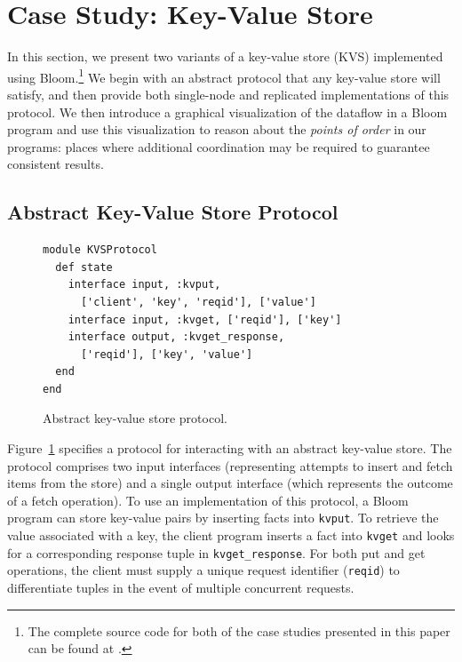 \section{Case Study: Key-Value Store}
\label{sec:kvs}
In this section, we present two variants of a key-value store (KVS) implemented
using Bloom.\footnote{The complete source code for both of the case studies
  presented in this paper can be found at .}  We begin with an
abstract protocol that any key-value store will satisfy, and then provide both
single-node and replicated implementations of this protocol. We then introduce a
graphical visualization of the dataflow in a Bloom program and use this
visualization to reason about the \emph{points of order} in our programs: places
where additional coordination may be required to guarantee consistent results.

\subsection{Abstract Key-Value Store Protocol}

\begin{figure}[t]
\begin{scriptsize}
\begin{lstlisting}
module KVSProtocol
  def state
    interface input, :kvput, 
      ['client', 'key', 'reqid'], ['value']
    interface input, :kvget, ['reqid'], ['key']
    interface output, :kvget_response, 
      ['reqid'], ['key', 'value']
  end
end
\end{lstlisting}
\centering
\vspace{-10pt}
\caption{Abstract key-value store protocol.}
\label{fig:kvs-proto}
\end{scriptsize}
\vspace{-2pt}
\end{figure}

Figure~\ref{fig:kvs-proto} specifies a protocol for interacting with an abstract
key-value store. The protocol comprises two input interfaces (representing
attempts to insert and fetch items from the store) and a single output interface
(which represents the outcome of a fetch operation). To use an implementation of
this protocol, a Bloom program can store key-value pairs by inserting facts into
\texttt{kvput}. To retrieve the value associated with a key, the client program
inserts a fact into \texttt{kvget} and looks for a corresponding response tuple
in \texttt{kvget\_response}. For both put and get operations, the client
must supply a unique request identifier (\texttt{reqid}) to differentiate tuples
in the event of multiple concurrent requests.

